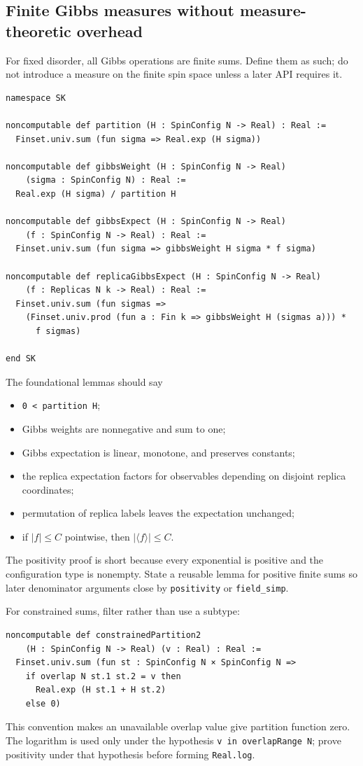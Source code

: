 \documentclass[11pt]{article}
\numberwithin{equation}{section}
\newcommand{\1}{\mathbf 1}
\begin{document}
\subsection{Finite Gibbs measures without measure-theoretic overhead}

For fixed disorder, all Gibbs operations are finite sums.  Define them as
such; do not introduce a measure on the finite spin space unless a later API
requires it.
\begin{lstlisting}
namespace SK

noncomputable def partition (H : SpinConfig N -> Real) : Real :=
  Finset.univ.sum (fun sigma => Real.exp (H sigma))

noncomputable def gibbsWeight (H : SpinConfig N -> Real)
    (sigma : SpinConfig N) : Real :=
  Real.exp (H sigma) / partition H

noncomputable def gibbsExpect (H : SpinConfig N -> Real)
    (f : SpinConfig N -> Real) : Real :=
  Finset.univ.sum (fun sigma => gibbsWeight H sigma * f sigma)

noncomputable def replicaGibbsExpect (H : SpinConfig N -> Real)
    (f : Replicas N k -> Real) : Real :=
  Finset.univ.sum (fun sigmas =>
    (Finset.univ.prod (fun a : Fin k => gibbsWeight H (sigmas a))) *
      f sigmas)

end SK
\end{lstlisting}

The foundational lemmas should say
\begin{itemize}[leftmargin=2em]
\item \texttt{0 < partition H};
\item Gibbs weights are nonnegative and sum to one;
\item Gibbs expectation is linear, monotone, and preserves constants;
\item the replica expectation factors for observables depending on disjoint
      replica coordinates;
\item permutation of replica labels leaves the expectation unchanged;
\item if $|f|\le C$ pointwise, then
      $|\langle f\rangle|\le C$.
\end{itemize}
The positivity proof is short because every exponential is positive and the
configuration type is nonempty.  State a reusable lemma for positive finite
sums so later denominator arguments close by \texttt{positivity} or
\texttt{field\_simp}.

For constrained sums, filter rather than use a subtype:
\begin{lstlisting}
noncomputable def constrainedPartition2
    (H : SpinConfig N -> Real) (v : Real) : Real :=
  Finset.univ.sum (fun st : SpinConfig N × SpinConfig N =>
    if overlap N st.1 st.2 = v then
      Real.exp (H st.1 + H st.2)
    else 0)
\end{lstlisting}
This convention makes an unavailable overlap value give partition function
zero.  The logarithm is used only under the hypothesis
\texttt{v in overlapRange N}; prove positivity under that hypothesis before
forming \texttt{Real.log}.
\end{document}
